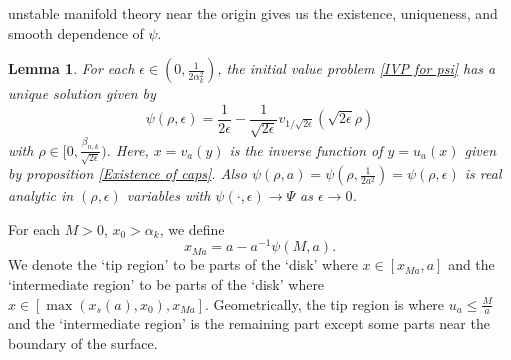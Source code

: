 \documentclass[pdflatex,sn-mathphys-num]{sn-jnl}
\newtheorem{lemma}[theorem]{Lemma}
\begin{document}
unstable manifold theory near the origin gives us the existence, uniqueness, and smooth dependence of $\psi$. 
\begin{lemma}\label{smooth dependence of cap solutions}
For each $\epsilon \in (0, \frac{1}{2\alpha_k^2})$, the initial value problem \eqref{IVP for psi} has a unique solution given by $$\psi(\rho, \epsilon) = \frac{1}{2\epsilon} - \frac{1}{\sqrt{2\epsilon}}v_{1/\sqrt{2\epsilon}}(\sqrt{2\epsilon}\rho)$$
with $\rho \in [0, \frac{\beta_{n,k}}{\sqrt{2\epsilon}})$. Here, $x = v_a(y)$ is the inverse function of $y = u_a(x)$ given by proposition \ref{Existence of caps}. Also
    $\psi(\rho, a) = \psi(\rho, \frac{1}{2a^2}) = \psi(\rho, \epsilon)$ is real analytic in $(\rho, \epsilon)$ variables with $\psi(\cdot, \epsilon) \to \Psi$ as $\epsilon \to 0$.
\end{lemma}
For each $M > 0$, $x_0 > \alpha_k$, we define \begin{equation}\label{definition of xma}
    x_{Ma} = a - a^{-1}\psi(M, a).
\end{equation}
We denote the `tip region' to be parts of the `disk' where $x \in [x_{Ma}, a]$ and the `intermediate region' to be parts of the `disk' where $x \in [\max(x_{s}(a), x_0), x_{Ma}]$. Geometrically, the tip region is where $u_a \leq \frac{M}{a}$ and the `intermediate region' is the remaining part except some parts near the boundary of the surface.\\
\end{document}
